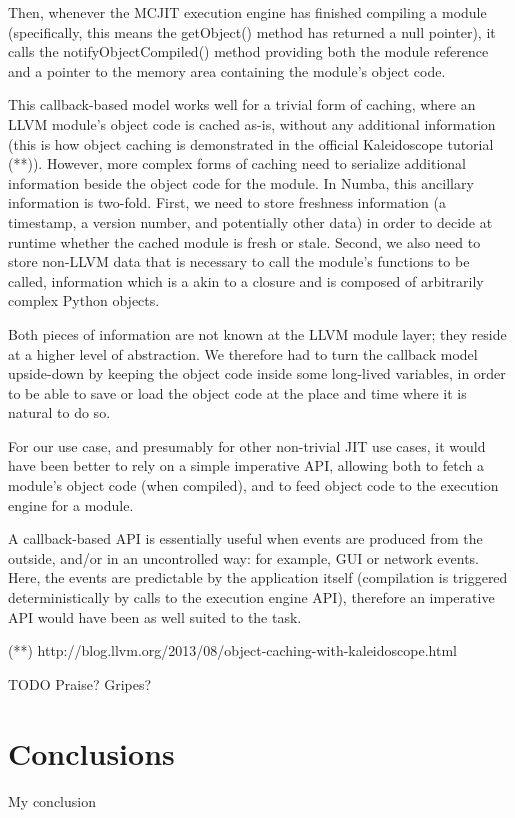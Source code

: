 \documentclass{acm_proc_article-sp}
\begin{document}
Then, whenever the MCJIT execution engine has finished compiling a
module (specifically, this means the getObject() method has returned
a null pointer), it calls the notifyObjectCompiled() method providing
both the module reference and a pointer to the memory area containing
the module's object code.

This callback-based model works well for a trivial form of caching,
where an LLVM module's object code is cached as-is, without any
additional information (this is how object caching is demonstrated in
the official Kaleidoscope tutorial (**)).  However, more complex forms of
caching need to serialize additional information beside the object code
for the module.  In Numba, this ancillary information is two-fold.  First,
we need to store freshness information (a timestamp, a version number,
and potentially other data) in order to decide at runtime whether the
cached module is fresh or stale.  Second, we also need to store non-LLVM
data that is necessary to call the module's functions to be called,
information which is a akin to a closure and is composed of arbitrarily
complex Python objects.

Both pieces of information are not known at the LLVM module layer;
they reside at a higher level of abstraction.  We therefore had to
turn the callback model upside-down by keeping the object code inside
some long-lived variables, in order to be able to save or load
the object code at the place and time where it is natural to do so.

For our use case, and presumably for other non-trivial JIT use cases,
it would have been better to rely on a simple imperative API, allowing
both to fetch a module's object code (when compiled), and to feed object
code to the execution engine for a module.

A callback-based API is essentially useful when events are produced from
the outside, and/or in an uncontrolled way: for example, GUI or network
events.  Here, the events are predictable by the application
itself (compilation is triggered deterministically by calls to the
execution engine API), therefore an imperative API would have been as
well suited to the task.

(**) http://blog.llvm.org/2013/08/object-caching-with-kaleidoscope.html



TODO Praise? Gripes?

\section{Conclusions}
My conclusion
\end{document}
